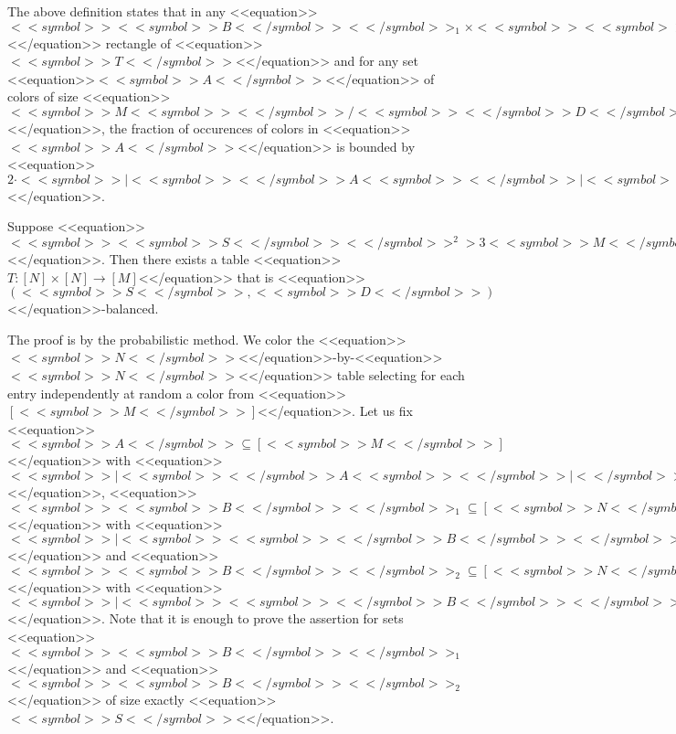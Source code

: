 \documentclass[proceedings]{stacs}
\def\mapping{\rightarrow}
\begin{document}
The above definition states that in any <<equation>>$<<symbol>><<symbol>>B<</symbol>><</symbol>>_1 \times <<symbol>><<symbol>>B<</symbol>><</symbol>>_2$<</equation>> rectangle of <<equation>>$<<symbol>>T<</symbol>>$<</equation>> and for any set <<equation>>$<<symbol>>A<</symbol>>$<</equation>> of colors of size <<equation>>$<<symbol>>M<<symbol>><</symbol>>/<<symbol>><</symbol>>D<</symbol>>$<</equation>>, the fraction of occurences of colors in <<equation>>$<<symbol>>A<</symbol>>$<</equation>> is bounded by <<equation>>$2 \cdot <<symbol>>|<<symbol>><</symbol>>A<<symbol>><</symbol>>|<<symbol>><</symbol>>/<<symbol>><</symbol>>M<</symbol>>$<</equation>>.
\begin{lemma}
\label{l-balancedtable}
Suppose <<equation>>$<<symbol>><<symbol>>S<</symbol>><</symbol>>^2 > 3<<symbol>>M<</symbol>> + 3<<symbol>>M<</symbol>> \ln <<symbol>>D<</symbol>> +6<<symbol>>S<<symbol>><</symbol>>D<</symbol>> + 6<<symbol>>S<<symbol>><</symbol>>D<</symbol>> \ln(<<symbol>>N<<symbol>><</symbol>>/<<symbol>><</symbol>>S<</symbol>>)$<</equation>>. Then there exists a table <<equation>>$T : [N] \times [N] \mapping [M]$<</equation>> that is <<equation>>$(<<symbol>>S<</symbol>>,<<symbol>>D<</symbol>>)$<</equation>>-balanced.
\end{lemma}
\proof
The proof is by the probabilistic method. We color the <<equation>>$<<symbol>>N<</symbol>>$<</equation>>-by-<<equation>>$<<symbol>>N<</symbol>>$<</equation>> table selecting for each entry independently at random a color from <<equation>>$[<<symbol>>M<</symbol>>]$<</equation>>. Let us fix <<equation>>$<<symbol>>A<</symbol>> \subseteq [<<symbol>>M<</symbol>>]$<</equation>> with <<equation>>$<<symbol>>|<<symbol>><</symbol>>A<<symbol>><</symbol>>|<</symbol>> = <<symbol>>M<<symbol>><</symbol>>/<<symbol>><</symbol>>D<</symbol>>$<</equation>>, <<equation>>$<<symbol>><<symbol>>B<</symbol>><</symbol>>_1 \subseteq [<<symbol>>N<</symbol>>]$<</equation>> with <<equation>>$<<symbol>>|<<symbol>><<symbol>><</symbol>>B<</symbol>><</symbol>>_1<<symbol>>|<</symbol>> = <<symbol>>S<</symbol>>$<</equation>> and <<equation>>$<<symbol>><<symbol>>B<</symbol>><</symbol>>_2 \subseteq [<<symbol>>N<</symbol>>]$<</equation>> with <<equation>>$<<symbol>>|<<symbol>><<symbol>><</symbol>>B<</symbol>><</symbol>>_2<<symbol>>|<</symbol>> = <<symbol>>S<</symbol>>$<</equation>>. Note that it is enough to prove the assertion for sets <<equation>>$<<symbol>><<symbol>>B<</symbol>><</symbol>>_1$<</equation>> and <<equation>>$<<symbol>><<symbol>>B<</symbol>><</symbol>>_2$<</equation>> of size exactly <<equation>>$<<symbol>>S<</symbol>>$<</equation>>.
\end{document}
